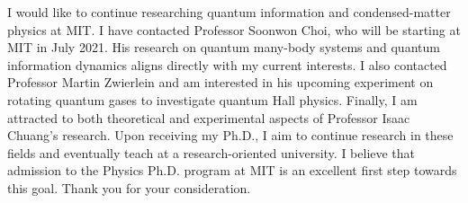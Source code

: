 \documentclass[12pt]{article}
\begin{document}
I would like to continue researching quantum information and condensed-matter physics at MIT. I have contacted Professor Soonwon Choi, who will be starting at MIT in July 2021. His research on quantum many-body systems and quantum information dynamics aligns directly with my current interests. I also contacted Professor Martin Zwierlein and am interested in his upcoming experiment on rotating quantum gases to investigate quantum Hall physics. Finally, I am attracted to both theoretical and experimental aspects of Professor Isaac Chuang's research. Upon receiving my Ph.D., I aim to continue research in these fields and eventually teach at a research-oriented university. I believe that admission to the Physics Ph.D. program at MIT is an excellent first step towards this goal. Thank you for your consideration.
	

















	
	
	
	
	
\end{document}
